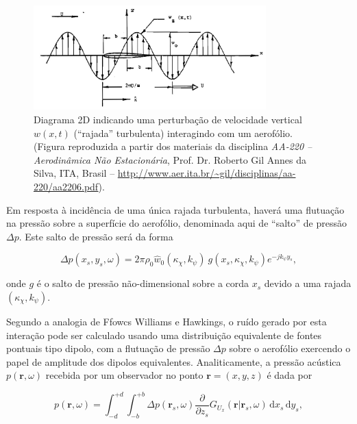 \documentclass[a4paper, 11pt, twoside]{article}
\newcommand{\ud}{\,\mathrm{d}}
\begin{document}
\begin{figure}[htbp]
	\centering
	\includegraphics[width=0.8\textwidth]{../figures/gust_ProfGil_ITA_aula06.jpg}
	\caption{Diagrama 2D indicando uma perturbação de velocidade vertical $w(x, t)$ (``rajada'' turbulenta) interagindo com um aerofólio. (Figura reproduzida a partir dos materiais da disciplina \emph{AA-220 -- Aerodinâmica Não Estacionária}, Prof. Dr. Roberto Gil Annes da Silva, ITA, Brasil -- \url{http://www.aer.ita.br/~gil/disciplinas/aa-220/aa2206.pdf}).}
	\label{fig:gust_airfoil_2D}
\end{figure}


Em resposta à incidência de uma única rajada turbulenta, haverá uma flutuação na pressão sobre a superfície do aerofólio, denominada aqui de ``salto'' de pressão $\Delta p$. Este salto de pressão será da forma

\begin{equation}
\Delta p(x_s, y_s, \omega) =  2 \pi \rho_0 \hat{w}_0(\kappa_\chi, k_\psi) \ g(x_s, \kappa_\chi, k_\psi) e^{-j k_\psi y_s},
\label{eq:DeltaP_SingleGust}
\end{equation}

\noindent onde $g$ é o salto de pressão não-dimensional sobre a corda $x_s$ devido a uma rajada $(\kappa_\chi, k_\psi)$.

Segundo a analogia de Ffowcs Williams e Hawkings, o ruído gerado por esta interação pode ser calculado usando uma distribuição equivalente de fontes pontuais tipo dipolo, com a flutuação de pressão $\Delta p$ sobre o aerofólio exercendo o papel de amplitude dos dipolos equivalentes. Analiticamente, a pressão acústica $p(\mathbf{r}, \omega)$ recebida por um observador no ponto $\mathbf{r} = (x, y, z)$ é dada por

\begin{equation}
	p(\mathbf{r}, \omega) = \int_{-d}^{+d} \int_{-b}^{+b} \Delta p(\mathbf{r}_s, \omega) \frac{\partial }{\partial z_s} G_{U_x}(\mathbf{r} | \mathbf{r}_s, \omega) \ud x_s \ud y_s,
	\label{eq:ac_radiation_single_gust}
\end{equation}
\end{document}
